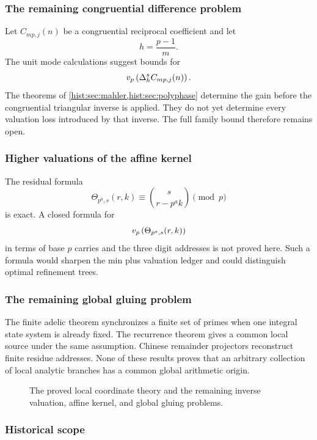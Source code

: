 \subsubsection{The remaining congruential difference problem}

Let \(C_{mp,j}(n)\) be a congruential reciprocal coefficient and let
\[
h=\frac{p-1}{m}.
\]
The unit mode calculations suggest bounds for
\[
v_p\left(\Delta_h^sC_{mp,j}(n)\right).
\]
The theorems of \cref{hist:sec:mahler,hist:sec:polyphase} determine the gain before the congruential triangular inverse is applied. They do not yet determine every valuation loss introduced by that inverse. The full family bound therefore remains open.

\subsubsection{Higher valuations of the affine kernel}

The residual formula
\[
\Theta_{p^a,s}(r,k)
\equiv
\binom{s}{r-p^ak}
\pmod p
\]
is exact. A closed formula for
\[
v_p\left(\Theta_{p^a,s}(r,k)\right)
\]
in terms of base \(p\) carries and the three digit addresses is not proved here. Such a formula would sharpen the min plus valuation ledger and could distinguish optimal refinement trees.

\subsubsection{The remaining global gluing problem}

The finite adelic theorem synchronizes a finite set of primes when one integral state system is already fixed. The recurrence theorem gives a common local source under the same assumption. Chinese remainder projectors reconstruct finite residue addresses. None of these results proves that an arbitrary collection of local analytic branches has a common global arithmetic origin.

\begin{figure}[t]
\centering
{}
\caption{The proved local coordinate theory and the remaining inverse valuation, affine kernel, and global gluing problems.}
\label{hist:fig:claim_boundary}
\end{figure}

\subsubsection{Historical scope}

